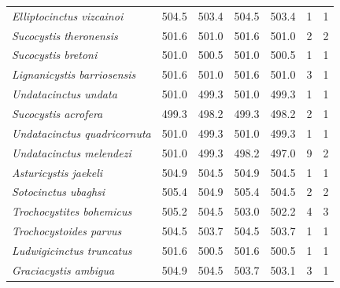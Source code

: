 \documentclass{article}
\begin{document}
\begin{table}[]
\begin{tabular}{l|llllll}
\textit{Elliptocinctus vizcainoi}    & 504.5 & 503.4 & 504.5 & 503.4 & 1  & 1  \\
\textit{Sucocystis theronensis}      & 501.6 & 501.0 & 501.6 & 501.0 & 2  & 2  \\
\rowcolor[HTML]{C0C0C0} 
\textit{Sucocystis bretoni}          & 501.0 & 500.5 & 501.0 & 500.5 & 1  & 1  \\
\textit{Lignanicystis barriosensis}  & 501.6 & 501.0 & 501.6 & 501.0 & 3  & 1  \\
\rowcolor[HTML]{C0C0C0} 
\textit{Undatacinctus undata}        & 501.0 & 499.3 & 501.0 & 499.3 & 1  & 1  \\
\textit{Sucocystis acrofera}         & 499.3 & 498.2 & 499.3 & 498.2 & 2  & 1  \\
\rowcolor[HTML]{C0C0C0} 
\textit{Undatacinctus quadricornuta} & 501.0 & 499.3 & 501.0 & 499.3 & 1  & 1  \\
\textit{Undatacinctus melendezi}     & 501.0 & 499.3 & 498.2 & 497.0 & 9  & 2  \\
\rowcolor[HTML]{C0C0C0} 
\textit{Asturicystis jaekeli}        & 504.9 & 504.5 & 504.9 & 504.5 & 1  & 1  \\
\textit{Sotocinctus ubaghsi}         & 505.4 & 504.9 & 505.4 & 504.5 & 2  & 2  \\
\rowcolor[HTML]{C0C0C0} 
\textit{Trochocystites bohemicus}    & 505.2 & 504.5 & 503.0 & 502.2 & 4  & 3  \\
\textit{Trochocystoides parvus}      & 504.5 & 503.7 & 504.5 & 503.7 & 1  & 1  \\
\rowcolor[HTML]{C0C0C0} 
\textit{Ludwigicinctus truncatus}    & 501.6 & 500.5 & 501.6 & 500.5 & 1  & 1  \\
\textit{Graciacystis ambigua}        & 504.9 & 504.5 & 503.7 & 503.1 & 3  & 1 
\end{tabular}
\end{table}
\end{document}
